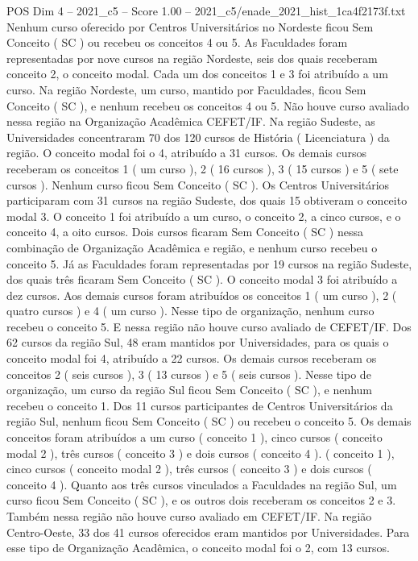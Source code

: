 \begin{textsample}{POS Dim 4 – 2021\_c5 – Score 1.00 – 2021\_c5/enade\_2021\_hist\_1ca4f2173f.txt}
Nenhum curso oferecido por Centros Universitários no Nordeste ficou Sem Conceito ( SC ) ou recebeu os conceitos 4 ou 5.
As Faculdades foram representadas por nove cursos na região Nordeste, seis dos quais receberam conceito 2, o conceito modal.
Cada um dos conceitos 1 e 3 foi atribuído a um curso.
Na região Nordeste, um curso, mantido por Faculdades, ficou Sem Conceito ( SC ), e nenhum recebeu os conceitos 4 ou 5.
Não houve curso avaliado nessa região na Organização Acadêmica CEFET/IF.
Na região Sudeste, as Universidades concentraram 70 dos 120 cursos de História ( Licenciatura ) da região.
O conceito modal foi o 4, atribuído a 31 cursos.
Os demais cursos receberam os conceitos 1 ( um curso ), 2 ( 16 cursos ), 3 ( 15 cursos ) e 5 ( sete cursos ).
Nenhum curso ficou Sem Conceito ( SC ).
Os Centros Universitários participaram com 31 cursos na região Sudeste, dos quais 15 obtiveram o conceito modal 3.
O conceito 1 foi atribuído a um curso, o conceito 2, a cinco cursos, e o conceito 4, a oito cursos.
Dois cursos ficaram Sem Conceito ( SC ) nessa combinação de Organização Acadêmica e região, e nenhum curso recebeu o conceito 5.
Já as Faculdades foram representadas por 19 cursos na região Sudeste, dos quais três ficaram Sem Conceito ( SC ).
O conceito modal 3 foi atribuído a dez cursos.
Aos demais cursos foram atribuídos os conceitos 1 ( um curso ), 2 ( quatro cursos ) e 4 ( um curso ).
Nesse tipo de organização, nenhum curso recebeu o conceito 5.
E nessa região não houve curso avaliado de CEFET/IF.
Dos 62 cursos da região Sul, 48 eram mantidos por Universidades, para os quais o conceito modal foi 4, atribuído a 22 cursos.
Os demais cursos receberam os conceitos 2 ( seis cursos ), 3 ( 13 cursos ) e 5 ( seis cursos ).
Nesse tipo de organização, um curso da região Sul ficou Sem Conceito ( SC ), e nenhum recebeu o conceito 1.
Dos 11 cursos participantes de Centros Universitários da região Sul, nenhum ficou Sem Conceito ( SC ) ou recebeu o conceito 5.
Os demais conceitos foram atribuídos a um curso ( conceito 1 ), cinco cursos ( conceito modal 2 ), três cursos ( conceito 3 ) e dois cursos ( conceito 4 ). ( conceito 1 ), cinco cursos ( conceito modal 2 ), três cursos ( conceito 3 ) e dois cursos ( conceito 4 ).
Quanto aos três cursos vinculados a Faculdades na região Sul, um curso ficou Sem Conceito ( SC ), e os outros dois receberam os conceitos 2 e 3.
Também nessa região não houve curso avaliado em CEFET/IF.
Na região Centro-Oeste, 33 dos 41 cursos oferecidos eram mantidos por Universidades.
Para esse tipo de Organização Acadêmica, o conceito modal foi o 2, com 13 cursos.

\end{textsample}
